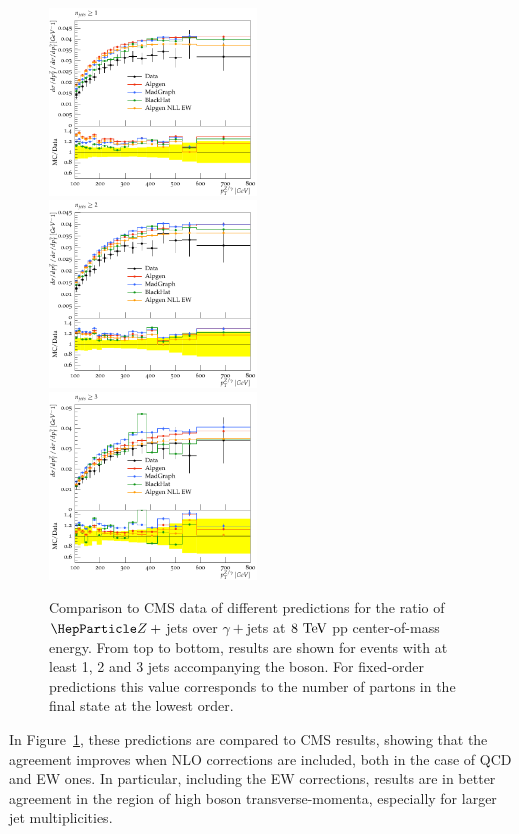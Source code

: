 \documentclass[11pt]{cernrep}
\begin{document}
\begin{figure}
\begin{center}
\includegraphics[width=0.49\textwidth]{d07-x01-y01.pdf} \\
\includegraphics[width=0.49\textwidth]{d08-x01-y01.pdf} \\
\includegraphics[width=0.49\textwidth]{d08-x02-y01.pdf}
 \caption{Comparison to CMS data of different predictions for the
   ratio of $\PZ+{}$jets over $\gamma+{}$jets at $8~\text{TeV}$ pp 
   center-of-mass energy. From top to bottom, results are shown for events with at least 1, 2 and 3 jets accompanying the
   boson. For fixed-order predictions this value corresponds to the number of partons in the final state at the lowest order.}
\label{zgrdata}
\end{center}
\end{figure}
%
In Figure~\ref{zgrdata}, these predictions are compared to CMS
results, showing that the agreement improves when NLO corrections are
included, both in the case of QCD and EW ones. In particular,
including the EW corrections, results are in better agreement in the
region of high boson transverse-momenta, especially for larger jet
multiplicities.
\end{document}

